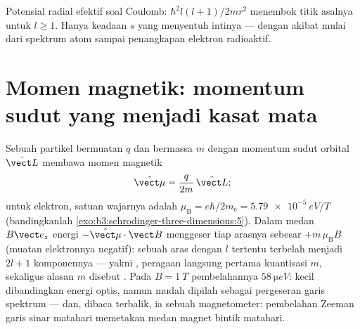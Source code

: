 \begin{omfigure}

{\small Potensial radial efektif soal Coulomb: 
$\hbar^2l(l+1)/2mr^2$ menembok titik asalnya untuk
$l \ge 1$. Hanya keadaan $s$ yang menyentuh intinya --- dengan akibat
mulai dari spektrum atom sampai penangkapan elektron radioaktif.}
\end{omfigure}

\section{Momen magnetik: momentum sudut yang menjadi kasat mata}

\begin{proposition}\label{prop:b3:quantum-angular-momentum:magnetic}
Sebuah partikel bermuatan $q$ dan bermassa $m$ dengan momentum sudut
orbital $\hat{\vect L}$ membawa momen magnetik
\[
\hat{\vect\mu} = \frac{q}{2m}\,\hat{\vect L} ;
\]
untuk elektron, satuan wajarnya adalah \emph{}
$\mu_{\text{B}} = e\hbar/2m_{\text{e}} = \qty{5.79e-5}{eV/T}$
(bandingkanlah \cref{exo:b3:schrodinger-three-dimensions:5}). Dalam
medan $B\vect e_z$ energi $-\hat{\vect\mu}\cdot\vect B$ menggeser tiap
arasnya sebesar $+m\,\mu_{\text{B}}B$ (muatan elektronnya negatif):
sebuah aras dengan $l$ tertentu terbelah menjadi $2l + 1$ komponennya
--- yakni \emph{}, peragaan langsung pertama kuantisasi
$m$, sekaligus alasan $m$ disebut .
Pada $B = \qty{1}{T}$ pembelahannya $\qty{58}{\micro eV}$: kecil
dibandingkan energi optis, namun mudah dipilah sebagai pergeseran garis
spektrum --- dan, dibaca terbalik, ia sebuah magnetometer: pembelahan
Zeeman garis sinar matahari memetakan medan magnet bintik matahari.
\end{proposition}

